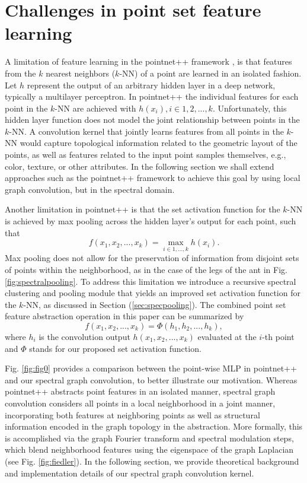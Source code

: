\documentclass[runningheads]{llncs}
\begin{document}
\section{Challenges in point set feature learning}\label{sec:limPointnet}
A limitation of feature learning in the pointnet++ framework \cite{qi2017pointnet}, is that features from the $k$ nearest neighbors ($k$-NN) of a point are learned in an isolated fashion. Let $h$ represent the output of an arbitrary hidden layer in a deep network, typically a multilayer perceptron. In pointnet++ the individual features for each point in the $k$-NN are achieved with $h(x_i), i \in {1,2,...,k}.$ Unfortunately, this hidden layer function does not model the joint relationship between points in the $k$-NN. A convolution kernel that jointly learns features from all points in the $k$-NN would capture topological information related to the geometric layout of the points, as well as features related to the input point samples themselves, e.g., color, texture, or other attributes. In the following section we shall extend approaches such as the pointnet++ framework to achieve this goal by using local graph convolution, but in the spectral domain. 

Another limitation in pointnet++ is that the set activation function for the $k$-NN is achieved by max pooling across the hidden layer's output for each point, such that
\begin{equation}
f(x_1,x_2, ... , x_k) = \max_{i \in {1,...,k}}  h(x_i).
\end{equation}
Max pooling does not allow for the preservation of information from disjoint sets of points within the neighborhood, as in the case of the legs of the ant in Fig. \ref{fig:spectralpooling}.
To address this limitation we introduce a recursive spectral clustering and pooling module that yields an improved set activation function for the $k$-NN, as discussed in Section (\ref{sec:specpooling}). The combined point set feature abstraction operation in this paper can be summarized by
\begin{equation}
f(x_1,x_2, ... , x_k) = \mathcal{\Phi}(h_1,h_2,...,h_k),
\end{equation}
where $h_i$ is the convolution output $h(x_1,x_2,...,x_k)$ evaluated at the $i$-th point and $\mathcal{\Phi}$ stands for our proposed set activation function. 

Fig. \ref{fig:fig0} provides a comparison between the point-wise MLP in pointnet++ \cite{qi2017pointnet} and our spectral graph convolution, to better illustrate our motivation. Whereas pointnet++ abstracts point features in an isolated manner, spectral graph convolution considers all points in a local neighborhood in a joint manner, incorporating both features at neighboring points as well as structural information encoded in the graph topology in the abstraction. More formally, this is accomplished via the graph Fourier transform and spectral modulation steps, which blend neighborhood features using the eigenspace of the graph Laplacian (see Fig. \ref{fig:fiedler}). 
In the following section, we provide theoretical background and implementation details of our spectral graph convolution kernel.
\end{document}
